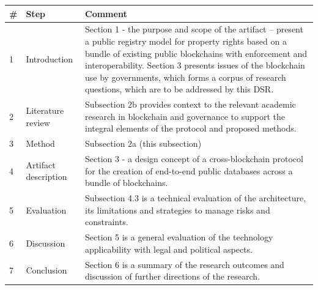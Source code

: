 \begin{center}
\begin{tabular}{|l|l|m{13cm}|}
\hline
\textbf{\#} & \textbf{Step} & \textbf{Comment}\\\hline
1 & Introduction & Section 1 - the purpose and scope of the artifact – present a public registry model for property rights based on a bundle of existing public blockchains with enforcement and interoperability. Section 3 presents issues of the blockchain use by governments, which forms a corpus of research questions, which are to be addressed by this DSR.\\\hline
2 & Literature review & Subsection 2b provides context to the relevant academic research in blockchain and governance to support the integral elements of the protocol and proposed methods.\\\hline
3 & Method & Subsection 2a (this subsection)\\\hline
4 & Artifact description & Section 3 - a design concept of a cross-blockchain protocol for the creation of end-to-end public databases across a bundle of blockchains.\\\hline
5 & Evaluation & Subsection 4.3 is a technical evaluation of the architecture, its limitations and strategies to manage risks and constraints.\\\hline
6 & Discussion & Section 5 is a general evaluation of the technology applicability with legal and political aspects.\\\hline
7 & Conclusion & Section 6 is a summary of the research outcomes and discussion of further directions of the research.\\
\hline
\end{tabular}
\end{center}
